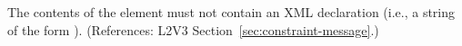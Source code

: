 The contents of the  element must not contain an XML
declaration (i.e., a string of the form ).  (References: L2V3
Section~\ref{sec:constraint-message}.)
